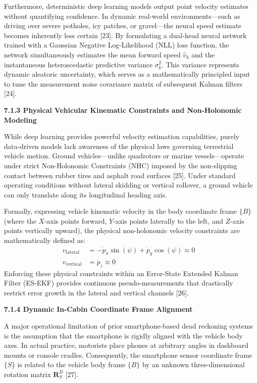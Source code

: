 \documentclass[11pt,a4paper]{article}
\begin{document}
Furthermore, deterministic deep learning models output point velocity estimates without quantifying confidence. In dynamic real-world environments—such as driving over severe potholes, icy patches, or gravel—the neural speed estimate becomes inherently less certain [23]. By formulating a dual-head neural network trained with a Gaussian Negative Log-Likelihood (NLL) loss function, the network simultaneously estimates the mean forward speed $\hat{v}_k$ and the instantaneous heteroscedastic predictive variance $\sigma_k^2$. This variance represents dynamic aleatoric uncertainty, which serves as a mathematically principled input to tune the measurement noise covariance matrix of subsequent Kalman filters [24].
\newpage

\textbf{7.1.3 Physical Vehicular Kinematic Constraints and Non-Holonomic Modeling}

While deep learning provides powerful velocity estimation capabilities, purely data-driven models lack awareness of the physical laws governing terrestrial vehicle motion. Ground vehicles—unlike quadrotors or marine vessels—operate under strict Non-Holonomic Constraints (NHC) imposed by the non-slipping contact between rubber tires and asphalt road surfaces [25]. Under standard operating conditions without lateral skidding or vertical rollover, a ground vehicle can only translate along its longitudinal heading axis.

Formally, expressing vehicle kinematic velocity in the body coordinate frame $\{B\}$ (where the $X$-axis points forward, $Y$-axis points laterally to the left, and $Z$-axis points vertically upward), the physical non-holonomic velocity constraints are mathematically defined as:
\begin{align}
v_{\text{lateral}} &= -\dot{p}_x \sin(\psi) + \dot{p}_y \cos(\psi) \approx 0 \\
v_{\text{vertical}} &= \dot{p}_z \approx 0
\end{align}
Enforcing these physical constraints within an Error-State Extended Kalman Filter (ES-EKF) provides continuous pseudo-measurements that drastically restrict error growth in the lateral and vertical channels [26].

\textbf{7.1.4 Dynamic In-Cabin Coordinate Frame Alignment}

A major operational limitation of prior smartphone-based dead reckoning systems is the assumption that the smartphone is rigidly aligned with the vehicle body axes. In actual practice, motorists place phones at arbitrary angles in dashboard mounts or console cradles. Consequently, the smartphone sensor coordinate frame $\{S\}$ is related to the vehicle body frame $\{B\}$ by an unknown three-dimensional rotation matrix $\mathbf{R}_S^B$ [27].
\end{document}
